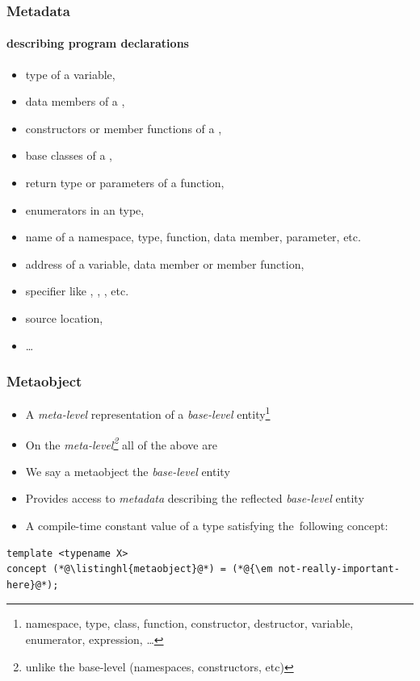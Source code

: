 \documentclass[compress,table,xcolor=table]{beamer}
\begin{document}
\begin{frame}
  \frametitle{Metadata}
  \framesubtitle{describing program declarations}
  \larger
  \begin{itemize}
    \item type of a variable,
    \item data members of a ,
    \item constructors or member functions of a ,
    \item base classes of a ,
    \item return type or parameters of a function,
    \item enumerators in an  type,
    \item name of a namespace, type, function, data member, parameter, etc.
    \item address of a variable, data member or member function,
    \item specifier like , ,
      , etc.
    \item source location,
    \item \ldots
  \end{itemize}
\end{frame}
\begin{frame}[fragile]
  \frametitle{Metaobject}
  \begin{itemize}
    \item A {\em meta-level} representation of a {\em base-level} entity\footnote{
      namespace, type, class, function, constructor, destructor, variable,
        enumerator, expression, \ldots}
    \item On the {\em meta-level\footnote{unlike the base-level (namespaces,
      constructors, etc)}} all of the above are 
    \item We say a metaobject  the {\em base-level} entity
    \item Provides access to {\em metadata} describing the reflected
      {\em base-level} entity
    \item A compile-time constant
    {\larger value} of a type satisfying the~following concept:
  \end{itemize}
  \begin{lstlisting}[language=c++2x]
template <typename X>
concept (*@\listinghl{metaobject}@*) = (*@{\em not-really-important-here}@*);
  \end{lstlisting}
\end{frame}
\end{document}
